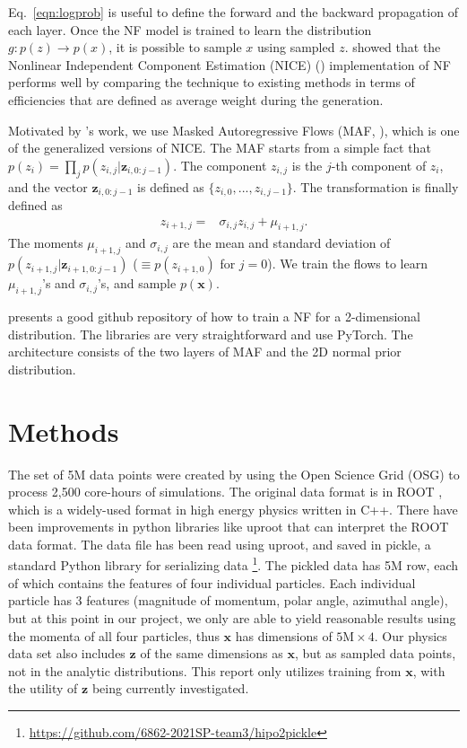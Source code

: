 Eq.~\ref{eqn:logprob} is useful to define the forward and the backward propagation of each layer.
Once the NF model is trained to learn the distribution $g: p(z)\rightarrow p(x)$, it is possible to sample $x$ using sampled $z$. \citet{PhysRevD.101.076002} showed that the Nonlinear Independent Component Estimation (NICE) (\citet{Dinh15}) implementation of NF performs well by comparing the technique to existing methods in terms of efficiencies that are defined as average weight during the generation.

Motivated by \citet{stan}'s work, we use Masked Autoregressive Flows (MAF, \citet{papamakarios2018masked}), which is one of the generalized versions of NICE. The MAF starts from a simple fact that $p(z_{i}) = \prod\limits_{j}p(z_{i,j}|\mathbf{z}_{i,0:j-1})$. The component $z_{i,j}$ is the $j$-th component of $z_i$, and the vector $\mathbf{z}_{i,0:j-1}$ is defined as $\{z_{i, 0}, ..., z_{i, j-1}\}$. The transformation is finally defined as
\begin{align}
    z_{i+1, j}=& \sigma_{i, j} z_{i, j} + \mu_{i+1, j}.
\end{align}
The moments $\mu_{i+1, j}$ and $\sigma_{i, j}$ are the mean and standard deviation of $p(z_{i+1,j}|\mathbf{z}_{i+1,0:j-1})$ ($\equiv p(z_{i+1,0})$ for $j=0$). We train the flows to learn $\mu_{i+1, j}$'s and $\sigma_{i, j}$'s, and sample $p(\mathbf{x})$.

\citet{papamakarios2018masked} presents a good github repository of how to train a NF for a 2-dimensional distribution. The libraries are very straightforward and use PyTorch. The architecture consists of the two layers of MAF and the 2D normal prior distribution.
\section{Methods}
The set of 5M data points were created by using the Open Science Grid (OSG) to process 2,500 core-hours of simulations. The original data format is in ROOT \cite{root}, which is a widely-used format in high energy physics written in C++. There have been improvements in python libraries like uproot \cite{uproot} that can interpret the ROOT data format. The data file has been read using uproot, and saved in pickle, a standard Python library for serializing data \footnote{\url{https://github.com/6862-2021SP-team3/hipo2pickle}}. The pickled data has 5M row, each of which contains the features of four individual particles. Each individual particle has 3 features (magnitude of momentum, polar angle, azimuthal angle), but at this point in our project, we only are able to yield reasonable results using the momenta of all four particles, thus $\mathbf{x}$ has dimensions of $5\text{M}\times4$. Our physics data set also includes $\mathbf{z}$ of the same dimensions as $\mathbf{x}$, but as sampled data points, not in the analytic distributions. This report only utilizes training from $\mathbf{x}$, with the utility of $\mathbf{z}$  being currently investigated.


